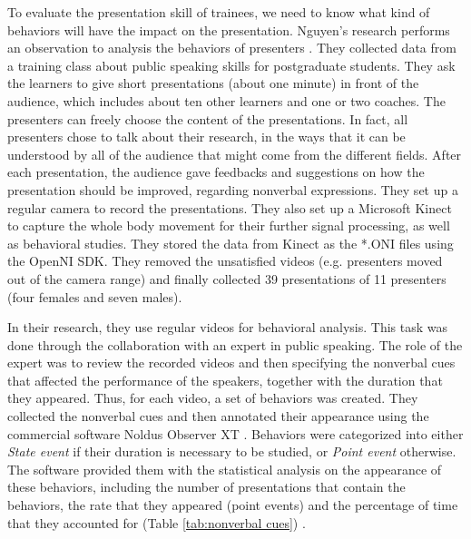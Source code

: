 \par To evaluate the presentation skill of trainees, we need to know what kind of behaviors will have the impact on the presentation. Nguyen's research performs an observation to analysis the behaviors of presenters \cite{nguyen2015intelligent}. They collected data from a training class about public speaking skills for postgraduate students. They ask the learners to give short presentations (about one minute) in front of the audience, which includes about ten other learners and one or two coaches. The presenters can freely choose the content of the presentations. In fact, all presenters chose to talk about their research, in the ways that it can be understood by all of the audience that might come from the different fields. After each presentation, the audience gave feedbacks and suggestions on how the presentation should be improved, regarding nonverbal expressions. They set up a regular camera to record the presentations. They also set up a Microsoft Kinect to capture the whole body movement for their further signal processing, as well as behavioral studies. They stored the data from Kinect as the *.ONI files using the OpenNI SDK. They removed the unsatisfied videos (e.g. presenters moved out of the camera range) and finally collected 39 presentations of 11 presenters (four females and seven males). 
\par In their research, they use regular videos for behavioral analysis. This task was done through the collaboration with an expert in public speaking. The role of the expert was to review the recorded videos and then specifying the nonverbal cues that affected the performance of the speakers, together with the duration that they appeared. Thus, for each video, a set of behaviors was created. They collected the nonverbal cues and then annotated their appearance using the commercial software Noldus Observer XT \cite{Zimmerman2009}. Behaviors were categorized into either \textit{State event} if their duration is necessary to be studied, or \textit{Point event} otherwise. The software provided them with the statistical analysis on the appearance of these behaviors, including the number of presentations that contain the behaviors, the rate that they appeared (point events) and the percentage of time that they accounted for (Table \ref{tab:nonverbal cues}) \cite{nguyen2015intelligent}.


